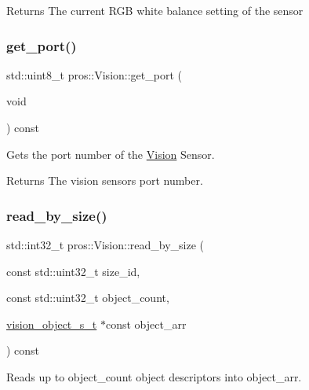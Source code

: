 \begin{DoxyReturn}{Returns}
The current R\+GB white balance setting of the sensor 
\end{DoxyReturn}
\mbox{\label{classpros_1_1Vision_af9958688590139df7b1227765f63d5ce}} 
\subsubsection{\texorpdfstring{get\+\_\+port()}{get\_port()}}
{\footnotesize\ttfamily std\+::uint8\+\_\+t pros\+::\+Vision\+::get\+\_\+port (\begin{DoxyParamCaption}\item[{void}]{ }\end{DoxyParamCaption}) const}



Gets the port number of the \hyperlink{classpros_1_1Vision}{Vision} Sensor. 

\begin{DoxyReturn}{Returns}
The vision sensor\textquotesingle{}s port number. 
\end{DoxyReturn}
\mbox{\label{classpros_1_1Vision_adb2a3e6a7c483cda5a32a341d5be0cc6}} 
\subsubsection{\texorpdfstring{read\+\_\+by\+\_\+size()}{read\_by\_size()}}
{\footnotesize\ttfamily std\+::int32\+\_\+t pros\+::\+Vision\+::read\+\_\+by\+\_\+size (\begin{DoxyParamCaption}\item[{const std\+::uint32\+\_\+t}]{size\+\_\+id,  }\item[{const std\+::uint32\+\_\+t}]{object\+\_\+count,  }\item[{\hyperlink{vision_8h_ae619120558539c13e53b5a6f42fb4375}{vision\+\_\+object\+\_\+s\+\_\+t} $\ast$const}]{object\+\_\+arr }\end{DoxyParamCaption}) const}



Reads up to object\+\_\+count object descriptors into object\+\_\+arr. 

